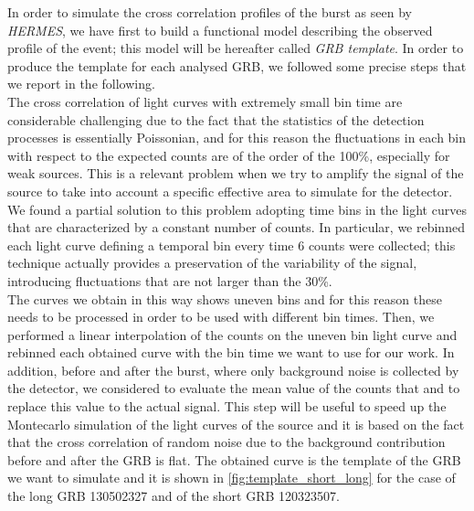 \documentclass[]{spie}  %
\def \her{\textit{HERMES}\xspace}
\begin{document}
In order to simulate the cross correlation profiles of the burst as seen by \her, we have first to build a functional model describing the observed profile of the event; this model will be hereafter called \textit{GRB template}.
In order to produce the template for each analysed GRB, we followed some precise steps that we report in the following. \\
The cross correlation of light curves with extremely small bin time are considerable challenging due to the fact that the statistics of the detection processes is essentially Poissonian, and for this reason the fluctuations in each bin with respect to the expected counts are of the order of the 100\%, especially for weak sources. This is a relevant problem when we try to amplify the signal of the source to take into account a specific effective area to simulate for the detector. We found a partial solution to this problem adopting time bins in the light curves that are characterized by a constant number of counts. In particular, we rebinned each light curve defining a temporal bin every time 6 counts were collected; this technique actually provides a preservation of the variability of the signal, introducing fluctuations that are not larger than the 30\%.\\ 
The curves we obtain in this way shows uneven bins and for this reason these needs to be processed in order to be used with different bin times. Then, we performed a linear interpolation of the counts on the uneven bin light curve and rebinned each obtained curve with the bin time we want to use for our work. In addition, before and after the burst, where only background noise is collected by the detector, we considered to evaluate the mean value of the counts that and to replace this value to the actual signal. This step will be useful to speed up the Montecarlo simulation of the light curves of the source and it is based on the fact that the cross correlation of random noise due to the background contribution before and after the GRB is flat. The obtained curve is the template of the GRB we want to simulate and it is shown in \autoref{fig:template_short_long} for the case of the long GRB 130502327 and of the short GRB 120323507. \\
\end{document}
